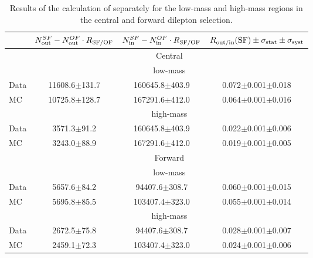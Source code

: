 
\begin{table}[hbtp]
 \renewcommand{\arraystretch}{1.3}
 \setlength{\belowcaptionskip}{6pt}
 \centering
 \caption{Results of the calculation of \Routin separately for the low-mass and high-mass regions in the central and forward dilepton selection.}
  \label{tab:rOutIn}
\begin{tabular}{l|c|c|c}     
 & $N_{\text{out}}^{SF} - N_{\text{out}}^{OF}\cdot R_{\text{SF/OF}} $ & $N_{\text{in}}^{SF} - N_{\text{in}}^{OF}\cdot R_{\text{SF/OF}}$ & $ R_\text{out/in} (\text{SF}) \pm \sigma_{\text{stat}} \pm \sigma_{\text{syst}}$  \\    
\hline
 & \multicolumn{3}{c}{Central} \\
\hline 
 & \multicolumn{3}{c}{low-mass}   \\ \hline
  Data & 11608.6$\pm$131.7 & 160645.8$\pm$403.9 & 0.072$\pm$0.001$\pm$0.018 \\
 MC & 10725.8$\pm$128.7 & 167291.6$\pm$412.0 & 0.064$\pm$0.001$\pm$0.016 \\

\hline 
& \multicolumn{3}{c}{high-mass} \\ 
\hline
 Data & 3571.3$\pm$91.2 & 160645.8$\pm$403.9 & 0.022$\pm$0.001$\pm$0.006 \\
 MC & 3243.0$\pm$88.9 & 167291.6$\pm$412.0 & 0.019$\pm$0.001$\pm$0.005 \\

 
    \hline 
& \multicolumn{3}{c}{Forward} \\
\hline 
 & \multicolumn{3}{c}{low-mass}   \\ \hline
  Data & 5657.6$\pm$84.2 & 94407.6$\pm$308.7 & 0.060$\pm$0.001$\pm$0.015 \\
 MC & 5695.8$\pm$85.5 & 103407.4$\pm$323.0 & 0.055$\pm$0.001$\pm$0.014 \\

\hline 
& \multicolumn{3}{c}{high-mass} \\ 
\hline
 Data & 2672.5$\pm$75.8 & 94407.6$\pm$308.7 & 0.028$\pm$0.001$\pm$0.007 \\
 MC & 2459.1$\pm$72.3 & 103407.4$\pm$323.0 & 0.024$\pm$0.001$\pm$0.006 \\


  
\end{tabular}  
\end{table}
